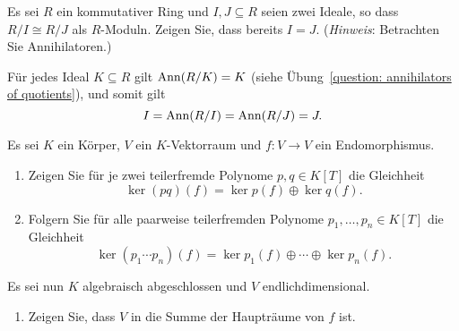 \begin{question}
  \label{question: quotients isomorphic as modules}
  Es sei $R$ ein kommutativer Ring und $I, J \subseteq R$ seien zwei Ideale, so dass $R/I \cong R/J$ als $R$-Moduln.
  Zeigen Sie, dass bereits $I = J$.
  (\emph{Hinweis}:
   Betrachten Sie Annihilatoren.)
\end{question}


\begin{solution}
  Für jedes Ideal $K \subseteq R$ gilt $\operatorname{Ann}(R/K) = K$ (siehe Übung~\ref{question: annihilators of quotients}), und somit gilt
  \[
      I
    = \operatorname{Ann}(R/I)
    = \operatorname{Ann}(R/J)
    = J.
  \]
\end{solution}


\begin{question}[subtitle = Existenz der Hauptraumzerlegung]
  Es sei $K$ ein Körper, $V$ ein $K$-Vektorraum und $f \colon V \to V$ ein Endomorphismus.
  \begin{enumerate}
    \item
      Zeigen Sie für je zwei teilerfremde Polynome $p, q \in K[T]$ die Gleichheit
      \[
        \ker {(pq)(f)} = \ker p(f) \oplus \ker q(f).
      \]
    \item
      Folgern Sie für alle paarweise teilerfremden Polynome $p_1, \dotsc, p_n \in K[T]$ die Gleichheit
      \[
          \ker {(p_1 \dotsm p_n)(f)}
        = \ker p_1(f) \oplus \dotsb \oplus \ker p_n(f).
      \]
  \end{enumerate}
  Es sei nun $K$ algebraisch abgeschlossen und $V$ endlichdimensional.
  \begin{enumerate}[resume]
    \item
      Zeigen Sie, dass $V$ in die Summe der Haupträume von $f$ ist.
  \end{enumerate}
\end{question}



